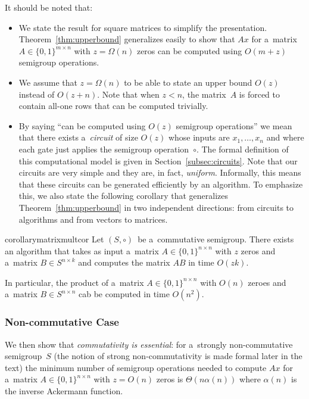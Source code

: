 \documentclass[11pt,letterpaper]{article}
\begin{document}
It should be noted that:
\begin{itemize}
\item We state the result for square matrices to simplify the presentation. Theorem~\ref{thm:upperbound} generalizes easily
to show that $Ax$ for a~matrix $A \in \{0,1\}^{m \times n}$ with $z=\Omega(n)$ zeros can be computed using $O(m+z)$ semigroup operations.
\item We assume that $z=\Omega(n)$ to be able to state an upper bound $O(z)$ instead of $O(z+n)$. Note that when
$z<n$, the matrix~$A$ is forced to contain all-one rows
that can be computed trivially.
\item By saying ``can be computed using $O(z)$ semigroup 
operations'' we mean that there exists a~\emph{circuit} of size 
$O(z)$ whose inputs are $x_1, \dotsc, x_n$ and where each 
gate just applies the semigroup operation~$\circ$. The formal 
definition of this computational model is given in 
Section~\ref{subsec:circuits}. Note that our 
circuits are very simple and they are, in fact, \emph{uniform}. 
Informally, this means that these circuits can be generated 
efficiently by an algorithm. To emphasize this, we also state the
following corollary that generalizes Theorem~\ref{thm:upperbound}
in two independent directions: from circuits to algorithms and from vectors to matrices.
\end{itemize}

\begin{restatable}{corollary}{matrixmultcor}
\label{cor:matrixmultiplication}
Let $(S, \circ)$~be a~commutative semigroup.{}
There exists an algorithm that takes as input 
a~matrix $A \in \{0,1\}^{n \times n}$ with $z$
zeros
and a~matrix $B \in S^{n \times k}$ and computes
the matrix $AB$ in time $O(zk)$.
\end{restatable}
In particular, the product of a~matrix $A \in \{0,1\}^{n \times n}$
with $O(n)$ zeroes and a~matrix $B \in S^{n \times n}$ cab be computed in time $O(n^2)$.

\subsubsection{Non-commutative Case}
We then show that \emph{commutativity is essential}: for
a~strongly non-commutative semigroup~$S$
(the notion of strong non-commutativity is made formal
later in the text) the minimum number of semigroup operations
needed to compute $Ax$ for a~matrix
$A \in \{0,1\}^{n \times n}$ with $z=O(n)$ zeros is
$\Theta(n\alpha(n))$ where $\alpha(n)$ is the inverse Ackermann function.
\end{document}
